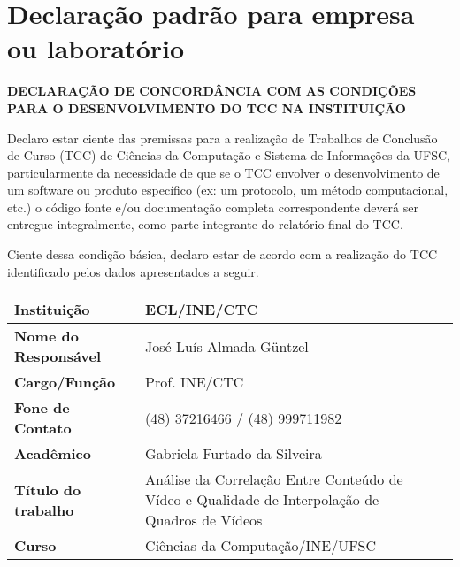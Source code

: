 \chapter{Declaração padrão para empresa ou laboratório}
	\begin{snugshade}

	\begin{center}
	{\textbf{DECLARAÇÃO DE CONCORDÂNCIA COM AS CONDIÇÕES PARA O DESENVOLVIMENTO DO TCC NA INSTITUIÇÃO}}
	\end{center}
		
	\end{snugshade}

	\vspace{10pt}

	Declaro estar ciente das premissas para a realização de Trabalhos de Conclusão de Curso (TCC) de Ciências da Computação e Sistema de In\-for\-ma\-ções da UFSC, particularmente da necessidade de que se o TCC envolver o desenvolvimento de um software ou produto específico (ex: um protocolo, um método computacional, etc.) o código fonte e/ou documentação completa correspondente deverá ser entregue integralmente, como parte integrante do relatório final do TCC. 

	Ciente dessa condição básica, declaro estar de acordo com a realização do TCC identificado pelos dados apresentados a seguir.

	\vspace{20pt}


		\begin{tabular}{|l|X p{8cm}|}
				\hline
			     \textbf{Instituição} &  ECL/INE/CTC \\ \hline
			     \textbf{Nome do Responsável} &  José Luís Almada G{\"u}ntzel \\ \hline
			     \textbf{Cargo/Função} &  Prof. INE/CTC \\ \hline
			     \textbf{Fone de Contato} &  (48) 37216466 / (48) 999711982 \\ \hline
			     \textbf{Acadêmico} & Gabriela Furtado da Silveira \\ \hline
			     \textbf{Título do trabalho} & Análise da Correlação Entre Conteúdo de Vídeo e Qualidade de Interpolação de Quadros de Vídeos
 \\ \hline
			     \textbf{Curso} & Ciências da Computação/INE/UFSC \\ \hline

		\end{tabular}

